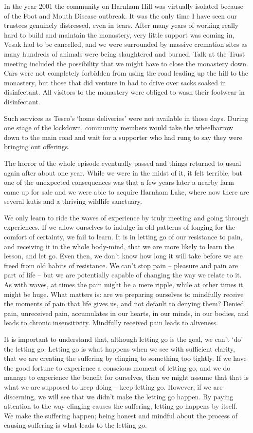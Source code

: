 In the year 2001 the community on Harnham Hill was virtually isolated
because of the Foot and Mouth Disease\cite{foot}
outbreak. It was the only time I have seen our
trustees genuinely distressed, even in tears. After many years of
working really hard to build and maintain the monastery, very little
support was coming in, Vesak had to be cancelled, and we were surrounded
by massive cremation sites as many hundreds of animals were being
slaughtered and burned. Talk at the Trust meeting included the
possibility that we might have to close the monastery down. Cars were
not completely forbidden from using the road leading up the hill to the
monastery, but those that did venture in had to drive over sacks soaked
in disinfectant. All visitors to the monastery were obliged to wash
their footwear in disinfectant.

Such services as Tesco's `home deliveries' were not available in those
days. During one stage of the lockdown, community members would take the
wheelbarrow down to the main road and wait for a supporter who had rung
to say they were bringing out offerings.

The horror of the whole episode eventually passed and things returned to
usual again after about one year. While we were in the midst of it, it
felt terrible, but one of the unexpected consequences was that a few
years later a nearby farm came up for sale and we were able to acquire
Harnham Lake, where now there are several kutis and a thriving wildlife
sanctuary.

We only learn to ride the waves of experience by truly meeting and going
through experiences. If we allow ourselves to indulge in old patterns of
longing for the comfort of certainty, we fail to learn. It is in letting
go of our resistance to pain, and receiving it in the whole body-mind,
that we are more likely to learn the lesson, and let go. Even then, we
don't know how long it will take before we are freed from old habits of
resistance. We can't stop pain -- pleasure and pain are part of life --
but we are potentially capable of changing the way we relate to it. As
with waves, at times the pain might be a mere ripple, while at other
times it might be huge. What matters is: are we preparing ourselves to
mindfully receive the moments of pain that life gives us, and not
default to denying them? Denied pain, unreceived pain, accumulates in
our hearts, in our minds, in our bodies, and leads to chronic
insensitivity. Mindfully received pain leads to aliveness.

It is important to understand that, although letting go is the goal, we
can't `do' the letting go. Letting go is what happens when we see with
sufficient clarity, that we are creating the suffering by clinging to
something too tightly. If we have the good fortune to experience a
conscious moment of letting go, and we do manage to experience the
benefit for ourselves, then we might assume that that is what we are
supposed to keep doing -- keep letting go. However, if we are
discerning, we will see that we didn't make the letting go happen. By
paying attention to the way clinging causes the suffering, letting go
happens by itself. We make the suffering happen; being honest and
mindful about the process of causing suffering is what leads to the
letting go.

